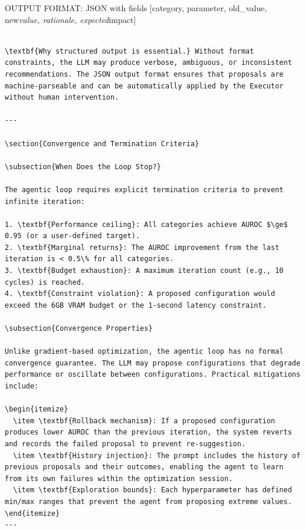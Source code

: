 \documentclass[12pt,a4paper,oneside]{report}
\begin{document}
OUTPUT FORMAT: JSON with fields [category, parameter, old_value,
new\textit{value, rationale, expected}impact]
\begin{verbatim}

\textbf{Why structured output is essential.} Without format constraints, the LLM may produce verbose, ambiguous, or inconsistent recommendations. The JSON output format ensures that proposals are machine-parseable and can be automatically applied by the Executor without human intervention.

---

\section{Convergence and Termination Criteria}

\subsection{When Does the Loop Stop?}

The agentic loop requires explicit termination criteria to prevent infinite iteration:

1. \textbf{Performance ceiling}: All categories achieve AUROC $\ge$ 0.95 (or a user-defined target).
2. \textbf{Marginal returns}: The AUROC improvement from the last iteration is < 0.5\% for all categories.
3. \textbf{Budget exhaustion}: A maximum iteration count (e.g., 10 cycles) is reached.
4. \textbf{Constraint violation}: A proposed configuration would exceed the 6GB VRAM budget or the 1-second latency constraint.

\subsection{Convergence Properties}

Unlike gradient-based optimization, the agentic loop has no formal convergence guarantee. The LLM may propose configurations that degrade performance or oscillate between configurations. Practical mitigations include:

\begin{itemize}
  \item \textbf{Rollback mechanism}: If a proposed configuration produces lower AUROC than the previous iteration, the system reverts and records the failed proposal to prevent re-suggestion.
  \item \textbf{History injection}: The prompt includes the history of previous proposals and their outcomes, enabling the agent to learn from its own failures within the optimization session.
  \item \textbf{Exploration bounds}: Each hyperparameter has defined min/max ranges that prevent the agent from proposing extreme values.
\end{itemize}
---


\end{verbatim}
\end{document}
